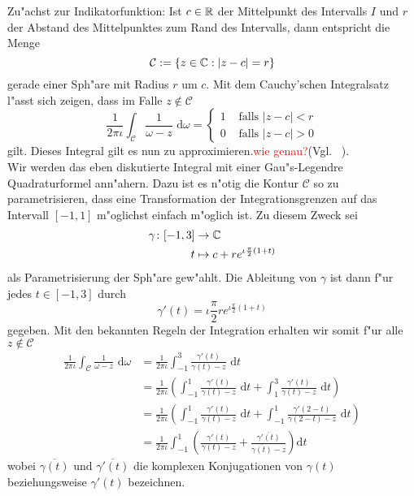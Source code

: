 Zu"achst zur Indikatorfunktion: Ist $c\in\mathbb{R}$ der Mittelpunkt des Intervalls $I$ und
$r$ der Abstand des Mittelpunktes zum Rand des Intervalls, dann entspricht die Menge
\[
\mathcal{C} := \{z\in\mathbb{C} : |z-c| = r\}
\]
gerade einer Sph"are mit Radius $r$ um $c$. Mit dem Cauchy'schen Integralsatz
l"asst sich zeigen, dass im Falle $z\notin \mathcal{C}$
\[
\frac{1}{2\pi\iota}\int_{ \mathcal{C}}\frac{1}{\omega-z}\text{ d}\omega
= \begin{cases}1 &\text{ falls }|z-c| < r \\ 0 &\text{ falls }|z-c| > 0 \end{cases}
\]
gilt. Dieses Integral gilt es nun zu approximieren.\textcolor{red}{wie genau?}(Vgl. ~\cite[20]{jaenich}).\\

Wir werden das eben diskutierte Integral mit einer Gau"s-Legendre Quadraturformel ann"ahern.
Dazu ist es n"otig die Kontur $\mathcal{C}$ so zu parametrisieren, dass eine Transformation
der Integrationsgrenzen auf das Intervall $[-1,1]$ m"oglichst einfach m"oglich ist. Zu diesem Zweck sei
\begin{align*}
\gamma\colon[-1,3]&\to\mathbb{C} \\
t&\mapsto c+re^{\iota \frac{\pi}{2}(1+t)}
\end{align*}
als Parametrisierung der Sph"are gew"ahlt. Die
Ableitung von $\gamma$ ist dann f"ur jedes $t\in[-1,3]$ durch
\[
\gamma'(t)=\iota \frac{\pi}{2}re^{\iota \frac{\pi}{2}(1+t)}
\]
gegeben. Mit den bekannten Regeln der Integration erhalten wir somit f"ur alle $z\notin\mathcal{C}$
\begin{align*}
\frac{1}{2\pi\iota}\int_{ \mathcal{C}}\frac{1}{\omega-z}\text{ d}\omega
&= \frac{1}{2\pi\iota} \int_{-1}^3 \frac{\gamma'(t)}{\gamma(t)-z}\text{ d}t \\
&= \frac{1}{2\pi\iota} \left( \int_{-1}^1 \frac{\gamma'(t)}{\gamma(t)-z} \text{ d}t +
\int_{1}^3\frac{\gamma'(t)}{\gamma(t)-z}\text{ d}t \right) \\
&= \frac{1}{2\pi\iota} \left( \int_{-1}^1 \frac{\gamma'(t)}{\gamma(t)-z} \text{ d}t +
\int_{-1}^1\frac{\gamma'(2-t)}{\gamma(2-t)-z}\text{ d}t \right) \\
&= \frac{1}{2\pi\iota} \int_{-1}^1 \left( \frac{\gamma'(t)}{\gamma(t)-z} +
\frac{\overline{\gamma'(t)}}{\overline{\gamma(t)}-z}\right)\text{d}t
\end{align*}
wobei $\overline{\gamma(t)}$ und $\overline{\gamma'(t)}$ die komplexen Konjugationen
von $\gamma(t)$ beziehungsweise $\gamma'(t)$ bezeichnen.\\

